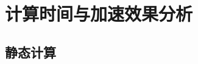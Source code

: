 \section{计算时间与加速效果分析}

\subsection{静态计算}

\begin{comment}

由于\ProgramName 和Citation均使用迭代算法进行求解，
而迭代算法的计算时间和通量的收敛程度有直接关系，
一般来说计算时间和迭代次数成正比。
但无论是计算本征值的外迭代还是求解线性方程的内迭代，
\ProgramName 和Citation都使用了不同的迭代方式，
两者对误差的估计方式也有所差别，不宜直接进行比较。

\begin{figure}
\centering
\texttt{[image: testresult\_iaea\_1cm]}
\caption{\label{fig:testresult.iaea}静态IAEA三维基准题1cm网格\ProgramName 与Citation的计算时间-通量最大偏差图}
\end{figure}

在实际应用中，相同误差时的计算时间才能反映程序间的速度差异，
这里分别选取不同的收敛精度使用\ProgramName 和Citation进行计算，
绘制两者的计算时间--偏差图，
这里取Citation在$\epsilon_\phi=5\times10^{-7}$时的计算结果作为参考值，
对于静态IAEA PWR 三维基准题1cm网格划分，
\ProgramName 与Citation在不同精度下的计算时间见\floatref{fig:testresult.iaea}，
可见不同的算法的计算时间和结果精度的关系差异很大，对结果进行拟合得
\begin{align}
  &T_\mathrm{CG-SG\ ML} = \exp\pb{-0.235151\log \epsilon_\phi-146.097\epsilon_\phi+1.87266}\\
  &T_\mathrm{CG-SG} = \exp\pb{-0.307056\log \epsilon_\phi+2.02687} \\
  &T_\mathrm{Citation} = \exp\pb{-414.444\epsilon_\phi+10.7569} 
\end{align}
取结果偏差为$\epsilon_\phi=0.01,0.003,0.001$进行比较得

\begin{table}
\centering
\begin{tabular}{crrr}
\topline
$\epsilon_\phi$ & $T_\mathrm{Citation}$ & $T_\mathrm{CG-SG\ ML}$ & $T_\mathrm{CG-SG}$\\
\midline
0.01  &   744.31 &  4.46 & 31.22 \\
0.003 & 13542.20 & 16.45 & 45.18 \\
0.001 & 31022.10 & 28.53 & 63.30 \\
\bottomline
\end{tabular}
\end{table}

\end{comment}

